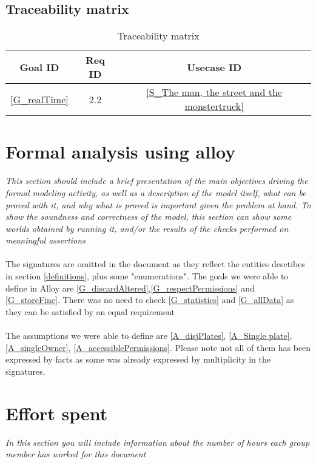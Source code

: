 \documentclass{article}
\begin{document}
	\subsection{Traceability matrix}
		\begin{table}[h]
			\begin{center}
				\caption{Traceability matrix}
				\label{Trace matrix}
				\begin{tabular}{S|S|S}
					\textbf{Goal ID} & \textbf{Req ID} & \textbf{Usecase ID}\\
					\hline
					\ref{G_realTime} & 2.2 & \ref{S_The man, the street and the monstertruck}
				\end{tabular}
			\end{center}
		\end{table}
\section{Formal analysis using alloy} \textit{This section should include a brief presentation of the main objectives driving the formal modeling activity, as well as a description of the model itself, what can be proved with it, and why what is proved is important given the problem at hand. To show the soundness and correctness of the model, this section can show some worlds obtained by running it, and/or the results of the checks performed on meaningful assertions}
	\paragraph{}The signatures are omitted in the document as they reflect the entities 				desctibes in section \ref{definitions}, plus some "enumerations". The goals we were able to define in Alloy are \ref{G_discardAltered},\ref{G_respectPermissions} and \ref{G_storeFine}.
	There was no need to check \ref{G_statistics} and \ref{G_allData} as they can be satisfied 	by an equal requirement
	\paragraph{}The assumptions we were able to define are \ref{A_disjPlates}, \ref{A_Single plate}, \ref{A_singleOwner}, \ref{A_accessiblePermissions}. Please note not all of them has been expressed by facts as some was already expressed by multiplicity in the signatures.
\section{Effort spent} \textit{In this section you will include information about the number of hours each group member has worked for this document}
\end{document}

